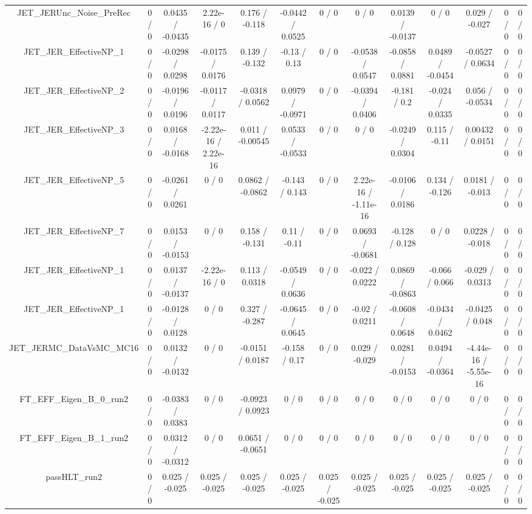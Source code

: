 \documentclass[10pt]{article}
\begin{document}
\begin{table}[htbp]
\begin{center}
\begin{tabular}{|c|c|c|c|c|c|c|c|c|c|c|c|c|}
  JET_JERUnc_Noise_PreRec & 0 / 0 & 0.0435 / -0.0435 & 2.22e-16 / 0 & 0.176 / -0.118 & -0.0442 / 0.0525 & 0 / 0 & 0 / 0 & 0.0139 / -0.0137 & 0 / 0 & 0.029 / -0.027 & 0 / 0 & 0 / 0 \\ 
  JET_JER_EffectiveNP_1 & 0 / 0 & -0.0298 / 0.0298 & -0.0175 / 0.0176 & 0.139 / -0.132 & -0.13 / 0.13 & 0 / 0 & -0.0538 / 0.0547 & -0.0858 / 0.0881 & 0.0489 / -0.0454 & -0.0527 / 0.0634 & 0 / 0 & 0 / 0 \\ 
  JET_JER_EffectiveNP_2 & 0 / 0 & -0.0196 / 0.0196 & -0.0117 / 0.0117 & -0.0318 / 0.0562 & 0.0979 / -0.0971 & 0 / 0 & -0.0394 / 0.0406 & -0.181 / 0.2 & -0.024 / 0.0335 & 0.056 / -0.0534 & 0 / 0 & 0 / 0 \\ 
  JET_JER_EffectiveNP_3 & 0 / 0 & 0.0168 / -0.0168 & -2.22e-16 / 2.22e-16 & 0.011 / -0.00545 & 0.0533 / -0.0533 & 0 / 0 & 0 / 0 & -0.0249 / 0.0304 & 0.115 / -0.11 & 0.00432 / 0.0151 & 0 / 0 & 0 / 0 \\ 
  JET_JER_EffectiveNP_5 & 0 / 0 & -0.0261 / 0.0261 & 0 / 0 & 0.0862 / -0.0862 & -0.143 / 0.143 & 0 / 0 & 2.22e-16 / -1.11e-16 & -0.0106 / 0.0186 & 0.134 / -0.126 & 0.0181 / -0.013 & 0 / 0 & 0 / 0 \\ 
  JET_JER_EffectiveNP_7 & 0 / 0 & 0.0153 / -0.0153 & 0 / 0 & 0.158 / -0.131 & 0.11 / -0.11 & 0 / 0 & 0.0693 / -0.0681 & -0.128 / 0.128 & 0 / 0 & 0.0228 / -0.018 & 0 / 0 & 0 / 0 \\ 
  JET_JER_EffectiveNP_1 & 0 / 0 & 0.0137 / -0.0137 & -2.22e-16 / 0 & 0.113 / 0.0318 & -0.0549 / 0.0636 & 0 / 0 & -0.022 / 0.0222 & 0.0869 / -0.0863 & -0.066 / 0.066 & -0.029 / 0.0313 & 0 / 0 & 0 / 0 \\ 
  JET_JER_EffectiveNP_1 & 0 / 0 & -0.0128 / 0.0128 & 0 / 0 & 0.327 / -0.287 & -0.0645 / 0.0645 & 0 / 0 & -0.02 / 0.0211 & -0.0608 / 0.0648 & -0.0434 / 0.0462 & -0.0425 / 0.048 & 0 / 0 & 0 / 0 \\ 
  JET_JERMC_DataVsMC_MC16 & 0 / 0 & 0.0132 / -0.0132 & 0 / 0 & -0.0151 / 0.0187 & -0.158 / 0.17 & 0 / 0 & 0.029 / -0.029 & 0.0281 / -0.0153 & 0.0494 / -0.0364 & -4.44e-16 / -5.55e-16 & 0 / 0 & 0 / 0 \\ 
  FT_EFF_Eigen_B_0_run2 & 0 / 0 & -0.0383 / 0.0383 & 0 / 0 & -0.0923 / 0.0923 & 0 / 0 & 0 / 0 & 0 / 0 & 0 / 0 & 0 / 0 & 0 / 0 & 0 / 0 & 0 / 0 \\ 
  FT_EFF_Eigen_B_1_run2 & 0 / 0 & 0.0312 / -0.0312 & 0 / 0 & 0.0651 / -0.0651 & 0 / 0 & 0 / 0 & 0 / 0 & 0 / 0 & 0 / 0 & 0 / 0 & 0 / 0 & 0 / 0 \\ 
  passHLT_run2 & 0 / 0 & 0.025 / -0.025 & 0.025 / -0.025 & 0.025 / -0.025 & 0.025 / -0.025 & 0.025 / -0.025 & 0.025 / -0.025 & 0.025 / -0.025 & 0.025 / -0.025 & 0.025 / -0.025 & 0 / 0 & 0 / 0 \\ 

\end{tabular}
\end{center}
\end{table}
\end{document}
